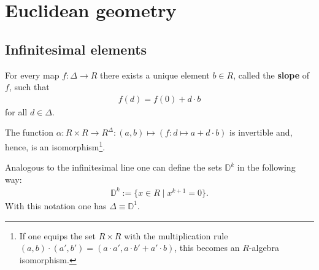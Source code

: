 \section{Euclidean geometry}
\subsection{Infinitesimal elements}


    \begin{axiom}\label{synth:kock_lawvere_axiom}
        For every map $f:\Delta\rightarrow R$ there exists a unique element $b\in R$, called the \textbf{slope} of $f$, such that
        \begin{gather}
            f(d) = f(0) + d\cdot b
        \end{gather}
        for all $d\in\Delta$.
    \end{axiom}
    \begin{result}
        The function $\alpha:R\times R\rightarrow  R^\Delta:(a,b)\mapsto(f:d\mapsto a+d\cdot b)$ is invertible and, hence, is an isomorphism\footnote{If one equips the set $R\times R$ with the multiplication rule $(a,b)\cdot(a',b') = (a\cdot a',a\cdot b' + a'\cdot b)$, this becomes an $R$-algebra isomorphism.}.
    \end{result}

    \begin{notation}
        Analogous to the infinitesimal line one can define the sets $\mathbb{D}^k$ in the following way:
        \begin{gather}
            \mathbb{D}^k := \{x\in R\mid x^{k+1}=0\}.
        \end{gather}
        With this notation one has $\Delta\equiv\mathbb{D}^1$.
    \end{notation}


